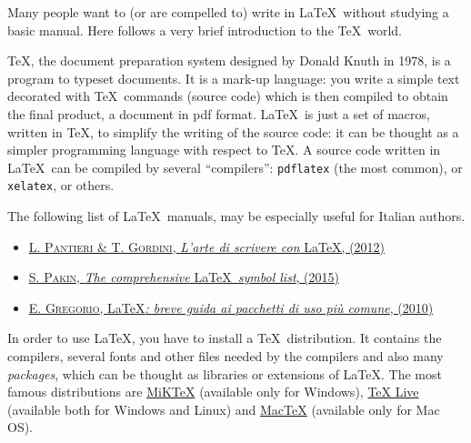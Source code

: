 \documentclass[a5paper,11pt]{article}
\begin{document}
Many people want to (or are compelled to) write in \LaTeX\ without studying
a basic manual. Here follows a very brief introduction to the \TeX\ world.

\TeX, the document preparation system designed by Donald Knuth in 1978, is a program to typeset documents.
It is a mark-up language: you write a simple text decorated with \TeX\ commands (source code) which is then compiled to obtain the final product, a document in pdf format. 
\LaTeX\ is just a set of macros, written in \TeX, to simplify the writing of the source code: it can be thought as a simpler programming language with respect to \TeX. A source code written in \LaTeX\ can be compiled by several ``compilers'': \texttt{pdflatex} (the most common), or \texttt{xelatex}, or others.

The following list of \LaTeX\ manuals, may be especially useful for Italian authors.

\begin{itemize}
\item \href{http://www.lorenzopantieri.net/LaTeX_files/ArteLaTeX.pdf}{\textsc{L. 
Pantieri \& T. Gordini}, \textit{L'arte di scrivere con} \LaTeX, (2012)}

\item \href{http://www.ctan.org/tex-archive/info/symbols/comprehensive/symbols-a4.pdf}{\textsc{S. Pakin}, \textit{The comprehensive} \LaTeX\ \textit{symbol list}, (2015)}

\item \href{http://profs.sci.univr.it/~gregorio/breveguida.pdf}{\textsc{E. Gregorio}, \LaTeX\textit{: breve guida ai pacchetti di uso pi\`u comune}, (2010)}
\end{itemize}

In order to use \LaTeX, you have to install a \TeX\ distribution. It contains the compilers, several fonts and other files needed by the compilers and also many \emph{packages}, which can be thought as libraries or extensions of \LaTeX. The most famous distributions are \href{http://miktex.org/}{MiKTeX} (available only for Windows), \href{http://www.tug.org/texlive/}{TeX Live} (available both for Windows and Linux) and \href{http://www.tug.org/mactex/2011/}{MacTeX} (available only for Mac OS).
\end{document}
